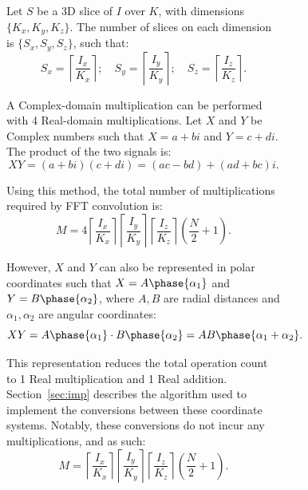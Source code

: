 \begin{figure}[!tb]
\begin{figure}[!tb]
    Let $S$ be a 3D slice of $I$ over $K$, with dimensions $\{K_x,K_y,K_z\}$. The number of slices on each dimension is $\{S_x,S_y,S_z\}$, such that:
    \begin{equation}
      S_{x} = \left\lceil\frac{I_x}{K_x}\right\rceil;\quad
      S_{y} = \left\lceil\frac{I_y}{K_y}\right\rceil;\quad
      S_{z} = \left\lceil\frac{I_z}{K_z}\right\rceil.
    \end{equation}

    A Complex-domain multiplication can be performed with 4 Real-domain multiplications. Let $X$ and $Y$ be Complex numbers such that $X=a+bi$ and $Y=c+di$. The product of the two signals is:
    \begin{equation}\label{eq:cmul-rect}
      XY = (a+bi)(c+di) = (ac-bd) + (ad+bc)i.
    \end{equation}

    Using this method, the total number of multiplications required by FFT convolution is:
    \begin{equation}\label{eq:fconv-mul1}
      M = 
      4
      \left\lceil\frac{I_x}{K_x}\right\rceil
      \left\lceil\frac{I_y}{K_y}\right\rceil
      \left\lceil\frac{I_z}{K_z}\right\rceil
      \left(\frac{N}{2}+1\right).
    \end{equation}

    However, $X$ and $Y$ can also be represented in polar coordinates such that $X=A\phase{\alpha_1}$ and $Y=B\phase{\alpha_2}$, where $A,B$ are radial distances and $\alpha_1,\alpha_2$ are angular coordinates:
    \begin{equation}\label{eq:cmul-pol}
      XY = A\phase{\alpha_1} \cdot B\phase{\alpha_2} = AB\phase{\alpha_1+\alpha_2}.
    \end{equation}

    This representation reduces the total operation count to 1 Real multiplication and 1 Real addition. Section~\ref{sec:imp} describes the algorithm used to implement the conversions between these coordinate systems. Notably, these conversions do not incur any multiplications, and as such:
    \begin{equation}\label{eq:fconv-mul2}
      M = 
      \left\lceil\frac{I_x}{K_x}\right\rceil
      \left\lceil\frac{I_y}{K_y}\right\rceil
      \left\lceil\frac{I_z}{K_z}\right\rceil
      \left(\frac{N}{2}+1\right).
    \end{equation}


\end{figure}
\end{figure}
